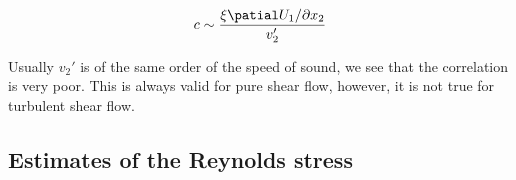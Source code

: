 \documentclass{article}
\begin{document}
\begin{equation*}
    c\sim\frac{\xi\patial U_1/\partial x_2}{v_2'}
\end{equation*}

Usually $v_2'$ is of the same order of the speed of sound, we see that the correlation is very poor. This is always valid for pure shear flow, however, it is not true for turbulent shear flow.


\subsection{Estimates of the Reynolds stress}





\ifx\allfiles\undefined         %
\end{document}
